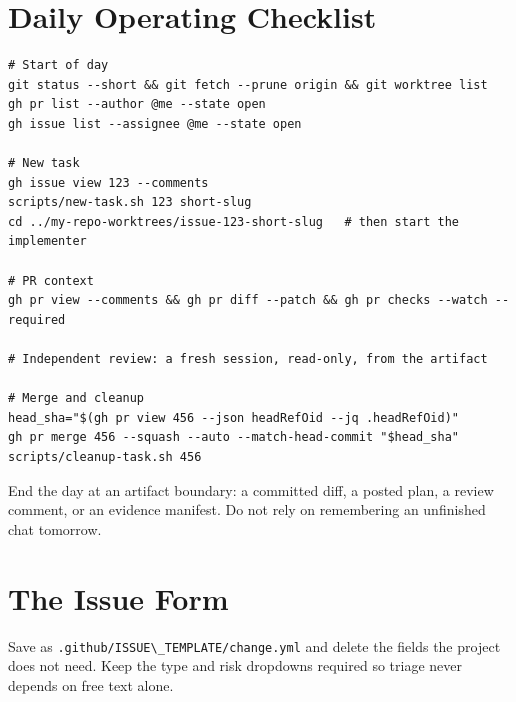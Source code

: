\documentclass[11pt]{article}
\newcommand{\co}[1]{\lstinline[basicstyle=\ttfamily\color{gwInk}]{#1}}
\begin{document}
\section{Daily Operating Checklist}

\begin{lstlisting}[style=gw]
# Start of day
git status --short && git fetch --prune origin && git worktree list
gh pr list --author @me --state open
gh issue list --assignee @me --state open

# New task
gh issue view 123 --comments
scripts/new-task.sh 123 short-slug
cd ../my-repo-worktrees/issue-123-short-slug   # then start the implementer

# PR context
gh pr view --comments && gh pr diff --patch && gh pr checks --watch --required

# Independent review: a fresh session, read-only, from the artifact

# Merge and cleanup
head_sha="$(gh pr view 456 --json headRefOid --jq .headRefOid)"
gh pr merge 456 --squash --auto --match-head-commit "$head_sha"
scripts/cleanup-task.sh 456
\end{lstlisting}

End the day at an artifact boundary: a committed diff, a posted plan, a review comment, or an
evidence manifest. Do not rely on remembering an unfinished chat tomorrow.

\appendix

\section{The Issue Form}
\label{app:issue}

Save as \co{.github/ISSUE\_TEMPLATE/change.yml} and delete the fields the project does not need.
Keep the type and risk dropdowns required so triage never depends on free text alone.
\end{document}
